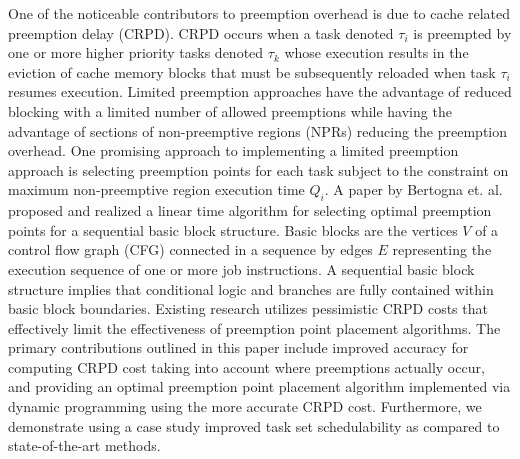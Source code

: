 One of the noticeable contributors to preemption overhead is due to cache related preemption delay (CRPD).  CRPD occurs when a task denoted \begin{math}\tau_{i}\end{math} is preempted by one or more higher priority tasks denoted \begin{math}\tau_{k}\end{math} whose execution results in the eviction of cache memory blocks that must be subsequently reloaded when task \begin{math}\tau_{i}\end{math} resumes execution.  Limited preemption approaches have the advantage of reduced blocking with a limited number of allowed preemptions while having the advantage of sections of non-preemptive regions (NPRs) reducing the preemption overhead.  One promising approach to implementing a limited preemption approach is selecting preemption points for each task subject to the constraint on maximum non-preemptive region execution time \begin{math}Q_{i}\end{math}.  A paper by Bertogna et. al.~\cite{bertogna:11} proposed and realized a linear time algorithm for selecting optimal preemption points for a sequential basic block structure.  Basic blocks are the vertices $V$ of a control flow graph (CFG) connected in a sequence by edges $E$ representing the execution sequence of one or more job instructions.  A sequential basic block structure implies that conditional logic and branches are fully contained within basic block boundaries.
Existing research utilizes pessimistic CRPD costs that effectively limit the effectiveness of preemption point placement algorithms.
The primary contributions outlined in this paper include improved accuracy for computing CRPD cost taking into account where preemptions actually occur, and providing an optimal preemption point placement algorithm implemented via dynamic programming using the more accurate CRPD cost.  Furthermore, we demonstrate using a case study improved task set schedulability as compared to state-of-the-art methods.

